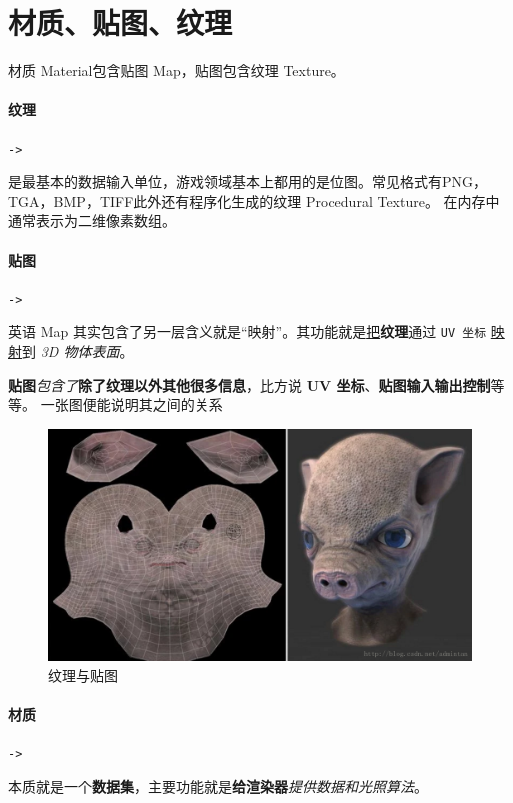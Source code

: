 \documentclass[UTF8,a4paper,12pt]{ctexbook}
\begin{document}
	\section{材质、贴图、纹理}
			材质 Material包含贴图 Map，贴图包含纹理 Texture。
			
			\paragraph{纹理}\verb|->|
			
				是最基本的数据输入单位，游戏领域基本上都用的是位图。常见格式有PNG，TGA，BMP，TIFF此外还有程序化生成的纹理 Procedural Texture。 
				在内存中通常表示为二维像素数组。
				
			\paragraph{贴图}\verb|->|
			
				英语 Map 其实包含了另一层含义就是“映射”。其功能就是\underline{把}\textbf{纹理}通过 \verb|UV 坐标| \underline{映射}到 \textit{3D 物体表面}。
				
				\textbf{贴图}\textit{包含了}\textbf{除了纹理以外其他很多信息}，比方说 \textbf{UV 坐标}、\textbf{贴图输入输出控制}等等。 
				一张图便能说明其之间的关系 
				\begin{figure}[H]
					\centering
					\includegraphics[scale=0.57]{Texture}
					\caption{纹理与贴图}
				\end{figure}
				
			\paragraph{材质}\verb|->|
			
				本质就是一个\textbf{数据集}，主要功能就是\textbf{给渲染器}\textit{提供数据和光照算法}。
				
\end{document}
